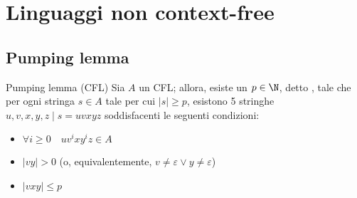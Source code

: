 \documentclass[a4paper, 12pt]{report}
\begin{document}
    \section{Linguaggi non context-free}

    \subsection{Pumping lemma}

    \begin{framedlem}{Pumping lemma (CFL)}
        Sia $A$ un CFL; allora, esiste un $p \in \N$, detto , tale che per ogni stringa $s \in A$ tale per cui $|s| \ge p$, esistono 5 stringhe $u, v, x, y, z \mid s = uvxyz$ soddisfacenti le seguenti condizioni:

        \begin{itemize}
            \item $\forall i \ge 0 \quad uv^ixy^iz \in A$
            \item $|vy| > 0$ (o, equivalentemente, $v \neq \varepsilon \lor y \neq \varepsilon$)
            \item $|vxy| \le p$
        \end{itemize}
    \end{framedlem}
\end{document}
